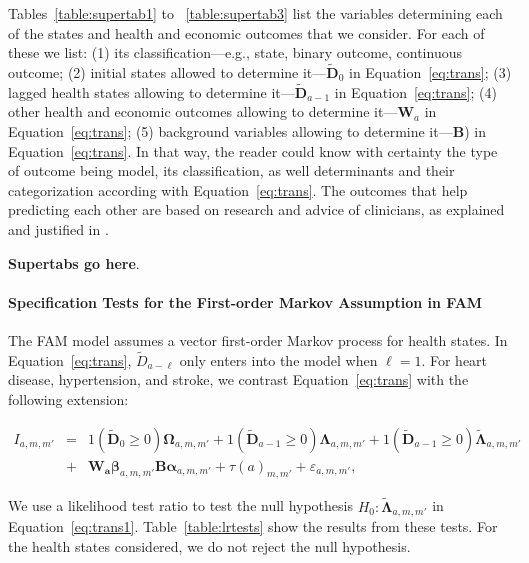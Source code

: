 Tables~\ref{table:supertab1} to ~\ref{table:supertab3} list the variables determining each of the states and health and economic outcomes that we consider. For each of these we list: (1) its classification---e.g., state, binary outcome, continuous outcome; (2) initial states allowed to determine it---$\tilde{\bm{D}}_0$ in Equation~\eqref{eq:trans}; (3) lagged health states allowing to determine it---$\tilde{\bm{D}}_{a-1}$ in Equation~\eqref{eq:trans}; (4) other health and economic outcomes allowing to determine it---$\bm{W}_a$ in Equation~\eqref{eq:trans}; (5) background variables allowing to determine it---$\bm{B}$) in Equation~\eqref{eq:trans}. In that way, the reader could know with certainty the type of outcome being model, its classification, as well determinants and their categorization according with Equation~\eqref{eq:trans}. The outcomes that help predicting each other are based on research and advice of clinicians, as explained and justified in \citet{Goldman_etal_2015_Future-Elderly-Model-Report}.

\textbf{Supertabs go here}.

\paragraph{Specification Tests for the First-order Markov Assumption in FAM} \label{section:firstorder}

\noindent The FAM model assumes a vector first-order Markov process for health states. In Equation~\eqref{eq:trans}, $\tilde{D}_{a - \ell}$ only enters into the model when $\ell = 1$. For heart disease, hypertension, and stroke, we contrast Equation~\eqref{eq:trans} with the following extension: 

\begin{eqnarray}
I_{a,m,m'} &=& \bm{\mathit{1}} \left( \tilde{\bm{D}}_{0} \geq 0 \right) \bm{\Omega}_{a,m,m'} + \bm{\mathit{1}} \left( \tilde{\bm{D}}_{a-1} \geq 0\right) \bm{\Lambda}_{a,m,m'}  + \bm{\mathit{1}} \left( \tilde{\bm{D}}_{a-1} \geq 0\right) \tilde{\bm{\Lambda}}_{a,m,m'} \nonumber \\ 
&+&  \bm{W_a} \bm{\beta}_{a,m,m'}  \bm{B} \bm{\alpha}_{a,m,m'} + \tau \left( a \right)_{m,m'} + \varepsilon_{a,m,m'}, \label{eq:trans1}
\end{eqnarray}

We use a likelihood test ratio to test the null hypothesis $H_0: \tilde{\bm{\Lambda}}_{a,m,m'}$ in Equation~\eqref{eq:trans1}. Table~\ref{table:lrtests} show the results from these tests. For the health states considered, we do not reject the null hypothesis.

